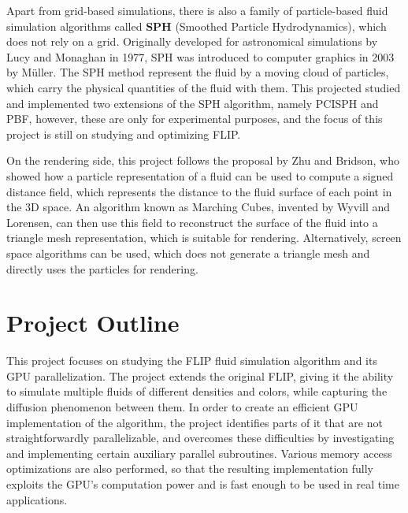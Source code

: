 Apart from grid-based simulations, there is also a family of particle-based fluid simulation algorithms called \textbf{SPH} (Smoothed Particle Hydrodynamics), which does not rely on a grid. Originally developed for astronomical simulations by Lucy\cite{lucy1977numerical} and Monaghan \cite{monaghan1992smoothed} in 1977, SPH was introduced to computer graphics in 2003 by Müller\cite{muller2003particle}. The SPH method represent the fluid by a moving cloud of particles, which carry the physical quantities of the fluid with them. This projected studied and implemented two extensions of the SPH algorithm, namely PCISPH\cite{solenthaler2009predictive} and PBF\cite{macklin2013position}, however, these are only for experimental purposes, and the focus of this project is still on studying and optimizing FLIP.

On the rendering side, this project follows the proposal by Zhu and Bridson\cite{zhu2005animating}, who showed how a particle representation of a fluid can be used to compute a signed distance field, which represents the distance to the fluid surface of each point in the 3D space. An algorithm known as Marching Cubes, invented by Wyvill\cite{wyvill1986soft} and Lorensen\cite{lorensen1987marching}, can then use this field to reconstruct the surface of the fluid into a triangle mesh representation, which is suitable for rendering. Alternatively, screen space algorithms\cite{van2009screen} can be used, which does not generate a triangle mesh and directly uses the particles for rendering.



\section{Project Outline}


This project focuses on studying the FLIP fluid simulation algorithm and its GPU parallelization. The project extends the original FLIP, giving it the ability to simulate multiple fluids of different densities and colors, while capturing the diffusion phenomenon between them. In order to create an efficient GPU implementation of the algorithm, the project identifies parts of it that are not straightforwardly parallelizable, and overcomes these difficulties by investigating and implementing certain auxiliary parallel subroutines. Various memory access optimizations are also performed, so that the resulting implementation fully exploits the GPU's computation power and is fast enough to be used in real time applications.


